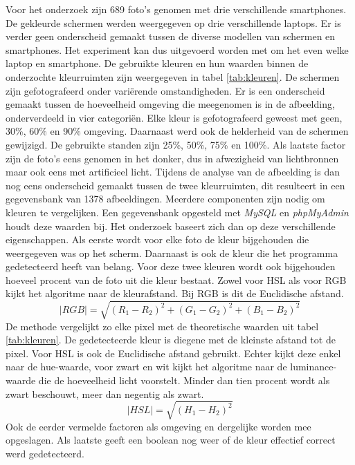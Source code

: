 Voor het onderzoek zijn 689 foto's genomen met drie verschillende smartphones. De gekleurde schermen werden weergegeven op drie verschillende laptops. Er is verder geen onderscheid gemaakt tussen de diverse modellen van schermen en smartphones. Het experiment kan dus uitgevoerd worden met om het even welke laptop en smartphone. De gebruikte kleuren en hun waarden binnen de onderzochte kleurruimten zijn weergegeven in tabel \ref{tab:kleuren}. De schermen zijn gefotografeerd onder variërende omstandigheden. Er is een onderscheid gemaakt tussen de hoeveelheid omgeving die meegenomen is in de afbeelding, onderverdeeld in vier categoriën. Elke kleur is gefotografeerd geweest met geen, 30\%, 60\% en 90\% omgeving. Daarnaast werd ook de helderheid van de schermen gewijzigd. De gebruikte standen zijn 25\%, 50\%, 75\% en 100\%. Als laatste factor zijn de foto's eens genomen in het donker, dus in afwezigheid van lichtbronnen maar ook eens met artificieel licht.  Tijdens de analyse van de afbeelding is dan nog eens onderscheid gemaakt tussen de twee kleurruimten, dit resulteert in een gegevensbank van 1378 afbeeldingen.  Meerdere componenten zijn nodig om kleuren te vergelijken. Een gegevensbank opgesteld met \textit{MySQL} en \textit{phpMyAdmin} houdt deze waarden bij. Het onderzoek baseert zich dan op deze verschillende eigenschappen. Als eerste wordt voor elke foto de kleur bijgehouden die weergegeven was op het scherm. Daarnaast is ook de kleur die het programma gedetecteerd heeft van belang. Voor deze twee kleuren wordt ook bijgehouden hoeveel procent van de foto uit die kleur bestaat. Zowel voor HSL als voor RGB kijkt het algoritme naar de kleurafstand. Bij RGB is dit de Euclidische afstand. 
$$ \mid RGB \mid = \sqrt{(R_1 - R_2)^2 + (G_1 - G_2)^2 + (B_1 - B_2)^2}$$
De methode vergelijkt zo elke pixel met de theoretische waarden uit tabel \ref{tab:kleuren}. De gedetecteerde kleur is diegene met de kleinste afstand tot de pixel. Voor HSL is ook de Euclidische afstand gebruikt. Echter kijkt deze enkel naar de hue-waarde, voor zwart en wit kijkt het algoritme naar de luminance-waarde die de hoeveelheid licht voorstelt. Minder dan tien procent wordt als zwart beschouwt, meer dan negentig als zwart. 
$$ \mid HSL \mid = \sqrt{(H_1 - H_2)^2 }$$
Ook de eerder vermelde factoren als omgeving en dergelijke worden mee opgeslagen. Als laatste geeft een boolean nog weer of de kleur effectief correct werd gedetecteerd.

